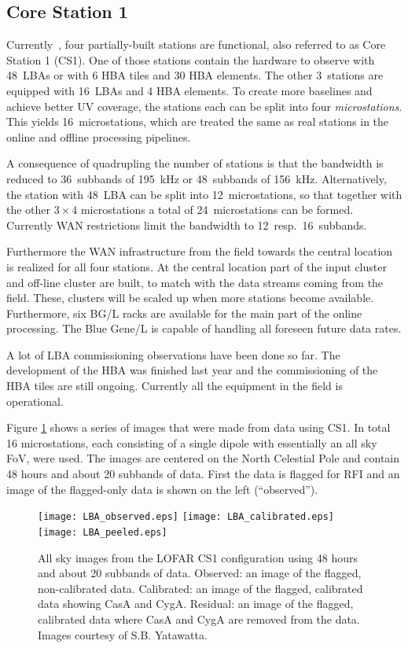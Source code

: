 \documentclass[journal]{IEEEtran}
\begin{document}
\subsection{Core Station 1}
Currently~\cite{gunst:06}, four partially-built stations are functional, also referred to as Core Station 1 (CS1). One of those stations contain the hardware to observe with 48~LBAs or with 6 HBA tiles and 30 HBA elements. The other 3~stations are equipped with 16~LBAs and 4 HBA elements.
To create more baselines and achieve better UV coverage, the stations each can be split into four {\em microstations}.
This yields 16~microstations, which are treated the same as real stations in the online and offline processing pipelines.

A consequence of quadrupling the number of stations is that the bandwidth
is reduced to 36~subbands of 195~kHz or 48~subbands of 156~kHz.
Alternatively, the station with 48~LBA can be split into 12~microstations,
so that together with the other $3\times4$ microstations a total of
24~microstations can be formed. Currently WAN restrictions limit the bandwidth to 12~resp.\ 16~subbands.

Furthermore the WAN infrastructure from the field towards the central location is realized for all four stations. At the central location part of the input cluster and off-line cluster are built, to match with the data streams coming from the field. These, clusters will be scaled up when more stations become available. Furthermore, six BG/L racks are available for the main part of the online processing. The Blue Gene/L is capable of handling all foreseen future data rates.

A lot of LBA commissioning observations have been done so far. The development of the HBA was finished last year and the commissioning of the HBA tiles are still ongoing. Currently all the equipment in the field is operational.

Figure \ref{fig:skymap} shows a series of images that were made from data using CS1. In total 16 microstations, each consisting of a single dipole with essentially an all sky FoV, were used. The images are centered on the North Celestial Pole and contain 48 hours and about 20 subbands of data. First the data is flagged for RFI and an image of the flagged-only data is shown on the left (``observed''). 

\begin{figure}
\centering
\texttt{[image: LBA\_observed.eps]}
\texttt{[image: LBA\_calibrated.eps]}
\texttt{[image: LBA\_peeled.eps]}
\caption{All sky images from the LOFAR CS1 configuration using 48 hours and about 20 subbands of data. Observed: an image of the flagged, non-calibrated data. Calibrated: an image of the flagged, calibrated data showing CasA and CygA. Residual: an image of the flagged, calibrated data where CasA and CygA are removed from the data. Images courtesy of S.B. Yatawatta.}
\label{fig:skymap}
\end{figure}
\end{document}
